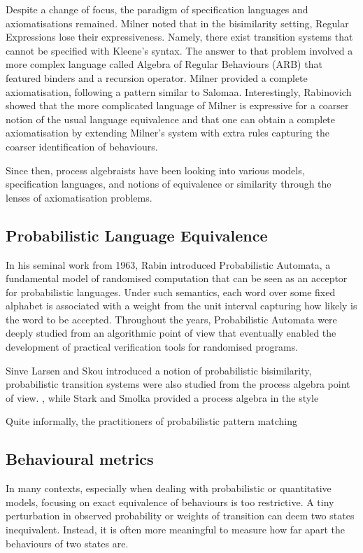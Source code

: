 Despite a change of focus, the paradigm of specification languages and axiomatisations remained. Milner noted that in the bisimilarity setting, Regular Expressions lose their expressiveness. Namely, there exist transition systems that cannot be specified with Kleene's syntax. The answer to that problem involved a more complex language called Algebra of Regular Behaviours (ARB) that featured binders and a recursion operator. Milner provided a complete axiomatisation, following a pattern similar to Salomaa. Interestingly, Rabinovich showed that the more complicated language of Milner is expressive for a coarser notion of the usual language equivalence and that one can obtain a complete axiomatisation by extending Milner's system with extra rules capturing the coarser identification of behaviours.


Since then, process algebraists have been looking into various models, specification languages, and notions of equivalence or similarity through the lenses of axiomatisation problems.
\subsection{Probabilistic Language Equivalence}
In his seminal work from 1963, Rabin introduced Probabilistic Automata, a fundamental model of randomised computation that can be seen as an acceptor for probabilistic languages. Under such semantics, each word over some fixed alphabet is associated with a weight from the unit interval capturing how likely is the word to be accepted. Throughout the years, Probabilistic Automata were deeply studied from an algorithmic point of view that eventually enabled the development of practical verification tools for randomised programs.  

Sinve Larsen and Skou introduced a notion of probabilistic bisimilarity, probabilistic transition systems were also studied from the process algebra point of view. , while Stark and Smolka provided a process algebra in the style 

Quite informally, the practitioners of probabilistic pattern matching

\subsection{Behavioural metrics}
In many contexts, especially when dealing with probabilistic or quantitative models, focusing on exact equivalence of behaviours is too restrictive. A tiny perturbation in observed probability or weights of transition can deem two states inequivalent.  Instead, it is often more meaningful to measure how far apart the behaviours of two states are. 

